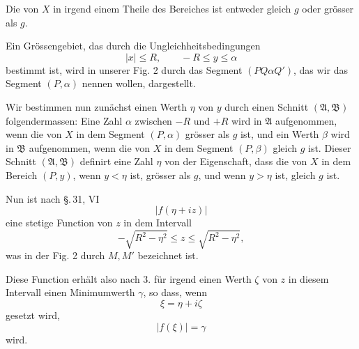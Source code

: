 

Die  von $X$ in irgend einem Theile des Bereiches ist entweder gleich $g$ oder grösser als $g$.

Ein Grössengebiet, das durch die Ungleichheitsbedingungen
\begin{equation}
 |x|\le R,\qquad -R\le y\le \alpha
\tag{7}
\end{equation}
bestimmt ist, wird in unserer Fig. 2 durch das Segment $(PQ\alpha Q')$, das wir das Segment $(P,\alpha)$ nennen wollen, dargestellt.


Wir bestimmen nun zunächst einen Werth $\eta$ von $y$ durch einen Schnitt $(\mathfrak A,\mathfrak B)$ folgendermassen: Eine Zahl $\alpha$ zwischen $-R$ und $+R$ wird in $\mathfrak A$ aufgenommen, wenn die  von $X$ in dem Segment $(P,\alpha)$ grösser als $g$ ist, und ein Werth $\beta$ wird in $\mathfrak B$ aufgenommen, wenn die  von $X$ in dem Segment $(P,\beta)$ gleich $g$ ist. Dieser Schnitt $(\mathfrak A,\mathfrak B)$ definirt eine Zahl $\eta$ von der Eigenschaft, dass die  von $X$ in dem Bereich $(P,y)$, wenn $y<\eta$ ist, grösser als $g$, und wenn $y>\eta$ ist, gleich $g$ ist.

Nun ist nach \S.\,31, VI
\[
 |f(\eta+iz)|
\]
eine stetige Function von $z$ in dem Intervall
\begin{equation}
 -\sqrt{R^2-\eta^2}\le z\le \sqrt{R^2-\eta^2},
\tag{8}
\end{equation}
was in der Fig. 2 durch $M,M'$ bezeichnet ist.

Diese Function erhält also nach 3. für irgend einen Werth $\zeta$ von $z$ in diesem Intervall einen Minimumwerth $\gamma$, so dass, wenn
\[
 \xi=\eta+i\zeta
\]
gesetzt wird,
\begin{equation}
 |f(\xi)|=\gamma
\tag{9}
\end{equation}
wird.
